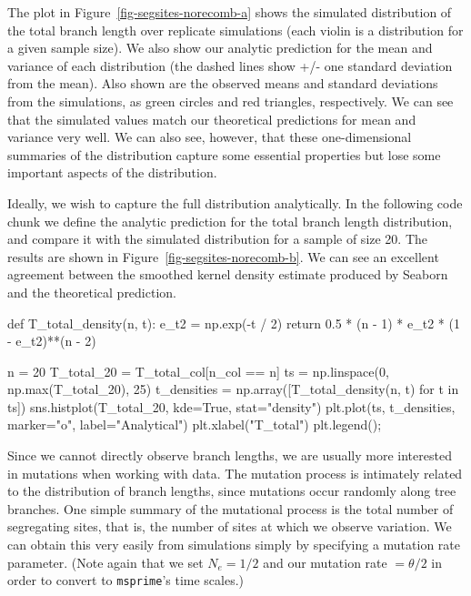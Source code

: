 \documentclass[graybox]{svmult}
\newcommand{\msprime}[0]{\texttt{msprime}}
\begin{document}
    The plot in Figure~\ref{fig-segsites-norecomb-a} shows the simulated
distribution of the total branch length
over replicate simulations (each violin is a distribution for a given
sample size). We also show our analytic prediction for the mean and
variance of each distribution (the dashed lines show +/- one standard
deviation from the mean). Also shown are the observed means and standard
deviations from the simulations, as green circles and red triangles,
respectively. We can see that the simulated values match our theoretical
predictions for mean and variance very well. We can also see, however,
that these one-dimensional summaries of the distribution capture some
essential properties but lose some important aspects of the
distribution.

    Ideally, we wish to capture the full distribution analytically. In the following code chunk we define the analytic
prediction for the total branch length distribution, and compare it with the simulated distribution for a sample of size 20. The results are shown in
Figure~\ref{fig-segsites-norecomb-b}. We can see an excellent agreement between
the smoothed kernel
density estimate produced by Seaborn and the theoretical prediction.

\begin{pythoncode}
def T_total_density(n, t):
    e_t2 = np.exp(-t / 2)
    return 0.5 * (n - 1) * e_t2 * (1 - e_t2)**(n - 2)

n = 20
T_total_20 = T_total_col[n_col == n]
ts = np.linspace(0, np.max(T_total_20), 25)
t_densities = np.array([T_total_density(n, t) for t in ts])
sns.histplot(T_total_20, kde=True,
    stat="density")
plt.plot(ts, t_densities, marker="o", label="Analytical")
plt.xlabel("T_total")
plt.legend();
\end{pythoncode}

Since we cannot directly observe branch lengths, we are usually more
interested in mutations when working with data. The mutation process is
intimately related to the distribution of branch lengths, since
mutations occur randomly along tree branches. One simple summary of the
mutational process is the total number of segregating sites, that is, the number of
sites at which we observe variation. We can obtain this very
easily from simulations simply by specifying a mutation rate parameter.
(Note again that we set \(N_e=1/2\) and our mutation rate
\(= \theta / 2\) in order to convert to \msprime's time scales.)
\end{document}
